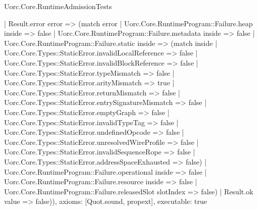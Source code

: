 \begin{lexlean}{Uorc.Core.RuntimeAdmissionTests}
\begin{semanticmodule}
{    | Result.error error => (match error
      | Uorc.Core.RuntimeProgram::Failure.heap inside => false
      | Uorc.Core.RuntimeProgram::Failure.metadata inside => false
      | Uorc.Core.RuntimeProgram::Failure.static inside => (match inside
        | Uorc.Core.Types::StaticError.invalidLocalReference => false
        | Uorc.Core.Types::StaticError.invalidBlockReference => false
        | Uorc.Core.Types::StaticError.typeMismatch => false
        | Uorc.Core.Types::StaticError.arityMismatch => true
        | Uorc.Core.Types::StaticError.returnMismatch => false
        | Uorc.Core.Types::StaticError.entrySignatureMismatch => false
        | Uorc.Core.Types::StaticError.emptyGraph => false
        | Uorc.Core.Types::StaticError.invalidTypeTag => false
        | Uorc.Core.Types::StaticError.undefinedOpcode => false
        | Uorc.Core.Types::StaticError.unresolvedWireProfile => false
        | Uorc.Core.Types::StaticError.invalidSequenceRope => false
        | Uorc.Core.Types::StaticError.addressSpaceExhausted => false)
      | Uorc.Core.RuntimeProgram::Failure.operational inside => false
      | Uorc.Core.RuntimeProgram::Failure.resource inside => false
      | Uorc.Core.RuntimeProgram::Failure.releasedSlot slotIndex => false)
    | Result.ok value => false)),
  axioms: [Quot.sound, propext],
  executable: true
}


\end{semanticmodule}
\end{lexlean}
